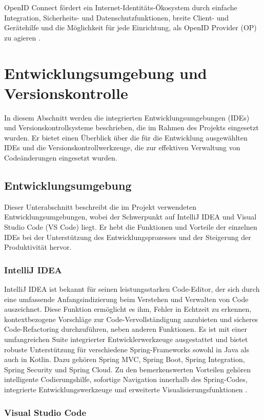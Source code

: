 OpenID Connect fördert ein Internet-Identitäts-Ökosystem durch einfache Integration, Sicherheits- und Datenschutzfunktionen, breite Client- und Gerätehilfe und die Möglichkeit für jede Einrichtung, als OpenID Provider (OP) zu agieren \cite{OpenId:o.J}.


\section{Entwicklungsumgebung und Versionskontrolle}
In diesem Abschnitt werden die integrierten Entwicklungsumgebungen (IDEs) und Versionskontrollsysteme beschrieben, die im Rahmen des Projekts eingesetzt wurden. Er bietet einen Überblick über die für die Entwicklung ausgewählten IDEs und die Versionskontrollwerkzeuge, die zur effektiven Verwaltung von Codeänderungen eingesetzt wurden.
\subsection{Entwicklungsumgebung}
Dieser Unterabschnitt beschreibt die im Projekt verwendeten Entwicklungsumgebungen, wobei der Schwerpunkt auf IntelliJ IDEA und Visual Studio Code (VS Code) liegt. Er hebt die Funktionen und Vorteile der einzelnen IDEs bei der Unterstützung des Entwicklungsprozesses und der Steigerung der Produktivität hervor.

\subsubsection{IntelliJ IDEA}

IntelliJ IDEA ist bekannt für seinen leistungsstarken Code-Editor, der sich durch eine umfassende Anfangsindizierung beim Verstehen und Verwalten von Code auszeichnet. Diese Funktion ermöglicht es ihm, Fehler in Echtzeit zu erkennen, kontextbezogene Vorschläge zur Code-Vervollständigung anzubieten und sicheres Code-Refactoring durchzuführen, neben anderen Funktionen. Es ist mit einer umfangreichen Suite integrierter Entwicklerwerkzeuge ausgestattet und bietet robuste Unterstützung für verschiedene Spring-Frameworks sowohl in Java als auch in Kotlin. Dazu gehören Spring MVC, Spring Boot, Spring Integration, Spring Security und Spring Cloud. Zu den bemerkenswerten Vorteilen gehören intelligente Codierungshilfe, sofortige Navigation innerhalb des Spring-Codes, integrierte Entwicklungswerkzeuge und erweiterte Visualisierungsfunktionen \cite{Jetbrains:o.J}.


\subsubsection{Visual Studio Code}

